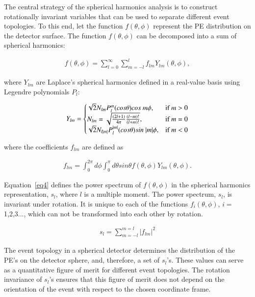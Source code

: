 The central strategy of the spherical harmonics analysis is to construct rotationally invariant variables that can be used to separate 
different event topologies. To this end, let the  function $f(\theta,\phi)$ represent the PE distribution on the detector surface. The function $f(\theta,\phi)$ can be decomposed into a sum of spherical harmonics:

\begin{eqnarray}
\label{eq1}
f(\theta,\phi) = \sum_{l=0}^{\infty} \sum_{m=-l}^{l} f_{lm} Y_{lm}(\theta,\phi),
\end{eqnarray}

where $Y_{lm}$ are Laplace's spherical harmonics defined in a real-value basis using Legendre polynomials $P_l$:

\begin{eqnarray}
\label{eq2}
Y_{lm} = \left\{
  \begin{array}{@{}ll@{}}
    \sqrt{2}N_{lm}P_l^m(cos\theta)cos~m\phi, & \text{if}\ m>0 \\
    N_{lm} = \sqrt{\frac{(2l+1)}{4\pi} \frac{(l-m)!}{(l+m)!}}, & \text{if}\ m=0 \\
    \sqrt{2}N_{l|m|}P_l^{|m|}(cos\theta)sin~|m|\phi, & \text{if}\ m<0
  \end{array}\right.
\end{eqnarray}

where the coefficients $f_{lm}$ are defined as
 
\begin{eqnarray}
\label{eq3}
f_{lm} = \int_{0}^{2\pi} d\phi \int_0^{\pi} d\theta sin\theta f(\theta,\phi) Y_{lm}(\theta,\phi).
\end{eqnarray}

Equation~\ref{eq4} defines the power spectrum of $f(\theta,\phi)$ in the spherical harmonics representation, $s_l$, where $l$ is a multiple moment. The power spectrum, $s_l$, is invariant under rotation. It is unique to each of the functions $f_i(\theta,\phi)$, $i=$1,2,3..., which can not be transformed into each other by rotation.

\begin{eqnarray}
\label{eq4}
s_l = \sum_{m=-l}^{m=l} |f_{lm}|^2
\end{eqnarray}

The event topology in a spherical detector determines the distribution of the PE's on the detector sphere, and, therefore, a set of $s_l$'s. These values can serve as a quantitative figure of merit for different event topologies. The rotation invariance of $s_l$'s ensures that this figure of merit does not depend on the orientation of the event with respect to the chosen coordinate frame.

